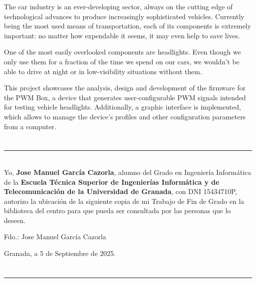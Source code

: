 The car industry is an ever-developing sector, always on the cutting edge of technological advances to produce increasingly sophisticated vehicles. Currently being the most used means of transportation, each of its components is extremely important: no matter how expendable it seems, it may even help to save lives.

One of the most easily overlooked components are headlights. Even though we only use them for a fraction of the time we spend on our cars, we wouldn't be able to drive at night or in low-visibility situations without them.

This project showcases the analysis, design and development of the firmware for the PWM Box, a device that generates user-configurable PWM signals intended for testing vehicle headlights. Additionally, a graphic interface is implemented, which allows to manage the device's profiles and other configuration parameters from a computer.

\chapter*{}
\thispagestyle{empty}

\noindent\rule[-1ex]{\textwidth}{2px}\\[4.5ex]

Yo, \textbf{Jose Manuel García Cazorla}, alumno del Grado en Ingeniería Informática de la \textbf{Escuela Técnica Superior de Ingenierías Informática y de Telecomunicación de la Universidad de Granada}, con DNI 15434710P, autorizo la ubicación de la siguiente copia de mi Trabajo de Fin de Grado en la biblioteca del centro para que pueda ser consultada por las personas que lo deseen.

\vspace{6cm}

\noindent Fdo.: Jose Manuel García Cazorla

\vspace{2cm}

\begin{flushright}
    Granada, a 5 de Septiembre de 2025.
\end{flushright}

\chapter*{}
\thispagestyle{empty}

\noindent\rule[-1ex]{\textwidth}{2px}\\[4.5ex]

